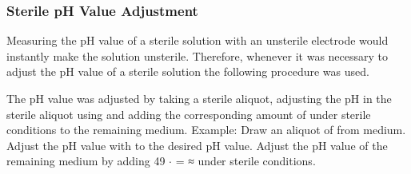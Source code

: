 \subsubsection{Sterile pH Value Adjustment}
Measuring the pH value of a sterile solution with an unsterile electrode would instantly make the solution unsterile. Therefore, whenever it was necessary to adjust the pH value of a sterile solution the following procedure was used.

The pH value was adjusted by taking a sterile aliquot, adjusting the pH in the sterile aliquot using   and adding the corresponding amount of   under sterile conditions to the remaining medium.
Example: Draw an aliquot of  from  medium. Adjust the pH value with    to the desired pH value. Adjust the pH value of the remaining medium by adding \num{49} $\cdot$  =  ≈     under sterile conditions.

